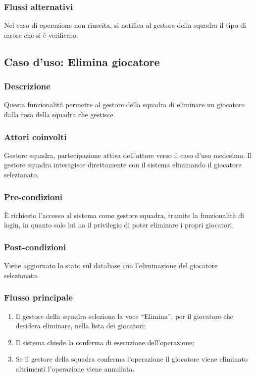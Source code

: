 \subsubsection*{Flussi alternativi}
Nel caso di operazione non riuscita, si notifica al gestore della squadra il tipo di errore che si è verificato.


%
%
\subsection{Caso d'uso: Elimina giocatore}

\subsubsection*{Descrizione}
Questa funzionalità permette al gestore della squadra di eliminare un giocatore dalla rosa della squadra che gestisce.

\subsubsection*{Attori coinvolti}
Gestore squadra, partecipazione attiva dell'attore verso il caso d'uso medesimo.
Il gestore squadra interagisce direttamente con il sistema eliminando il giocatore selezionato.

\subsubsection*{Pre-condizioni}
È richiesto l'accesso al sistema come gestore squadra, tramite la funzionalità di login, in quanto solo lui ha il privilegio di poter eliminare i propri giocatori.

\subsubsection*{Post-condizioni}
Viene aggiornato lo stato sul database con l'eliminazione del giocatore selezionato.

\subsubsection*{Flusso principale}

\begin{enumerate}
	
	\item
	Il gestore della squadra seleziona la voce ``Elimina'', per il giocatore che desidera eliminare, nella lista dei giocatori;
	
	\item
	Il sistema chiede la conferma di esecuzione dell'operazione;
	
	\item
	Se il gestore della squadra conferma l'operazione il giocatore viene eliminato altrimenti l'operazione viene annullata.
	
\end{enumerate}

